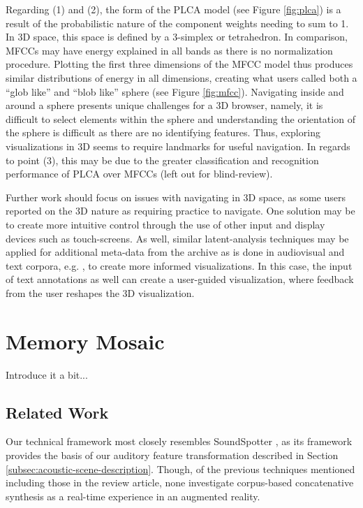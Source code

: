 \documentclass[a4paper,10pt,final]{ThesisStyle}
\begin{document}
Regarding (1) and (2), the form of the PLCA model (see Figure \ref{fig:plca}) is a result of the probabilistic nature of the component weights needing to sum to 1.  In 3D space, this space is defined by a 3-simplex or tetrahedron.  In comparison, MFCCs may have energy explained in all bands as there is no normalization procedure.  Plotting the first three dimensions of the MFCC model thus produces similar distributions of energy in all dimensions, creating what users called both a ``glob like'' and ``blob like'' sphere (see Figure \ref{fig:mfcc}).    Navigating inside and around a sphere presents unique challenges for a 3D browser, namely, it is difficult to select elements within the sphere and understanding the orientation of the sphere is difficult as there are no identifying features.  Thus, exploring visualizations in 3D seems to require landmarks for useful navigation.  In regards to point (3), this may be due to the greater classification and recognition performance of PLCA over MFCCs (left out for blind-review).  

Further work should focus on issues with navigating in 3D space, as some users reported on the 3D nature as requiring practice to navigate.  One solution may be to create more intuitive control through the use of other input and display devices such as touch-screens.  As well, similar latent-analysis techniques may be applied for additional meta-data from the archive as is done in audiovisual and text corpora, e.g. \cite{Himmel1998,Christel1998}, to create more informed visualizations.  In this case, the input of text annotations as well can create a user-guided visualization, where feedback from the user reshapes the 3D visualization. 




\section{Memory Mosaic}

Introduce it a bit... 

\subsection{Related Work}

Our technical framework most closely resembles SoundSpotter \cite{CaseyICMC2007}, as its framework provides the basis of our auditory feature transformation described in Section \ref{subsec:acoustic-scene-description}.  Though, of the previous techniques mentioned including those in the review article, none investigate corpus-based concatenative synthesis as a real-time experience in an augmented reality.
\end{document}
